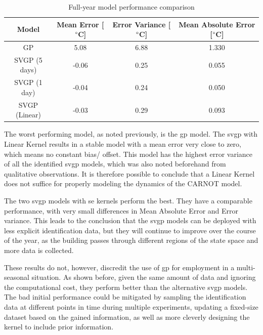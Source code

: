 \begin{table}[ht]
\centering
    \begin{tabular}{||c c c c||}
        \hline
        Model & Mean Error [$\degree$C] & Error Variance [$\degree$C] & Mean
        Absolute Error [$\degree$C]\\
        \hline \hline
        GP & 5.08 & 6.88 & 1.330 \\ 
        SVGP (5 days) & -0.06 & 0.25 & 0.055 \\ 
        SVGP (1 day) & -0.04 & 0.24 & 0.050 \\ 
        SVGP (Linear)& -0.03 & 0.29 & 0.093 \\ 
        \hline
    \end{tabular}
\caption{Full-year model performance comparison}
\label{tab:Model_comparations}
\end{table}

The worst performing model, as noted previously, is the \acrshort{gp} model. The
\acrshort{svgp} with Linear Kernel results in a stable model with a mean error
very close to zero, which means no constant bias/ offset. This model has the
highest error variance of all the identified \acrshort{svgp} models, which was
also noted beforehand from qualitative observations. It is therefore possible to
conclude that a Linear Kernel does not suffice for properly modeling the
dynamics of the CARNOT model.

The two \acrshort{svgp} models with \acrlong{se} kernels perform the best. They
have a comparable performance, with very small differences in Mean Absolute
Error and Error variance. This leads to the conclusion that the \acrshort{svgp}
models can be deployed with less explicit identification data, but they will
continue to improve over the course of the year, as the building passes through
different regions of the state space and more data is collected.

These results do not, however, discredit the use of \acrlong{gp} for employment
in a multi-seasonal situation. As shown before, given the same amount of data
and ignoring the computational cost, they perform better than the alternative
\acrshort{svgp} models. The bad initial performance could be mitigated by
sampling the identification data at different points in time during multiple
experiments, updating a fixed-size dataset based on the gained information, as
well as more cleverly designing the kernel to include prior information.


\clearpage
